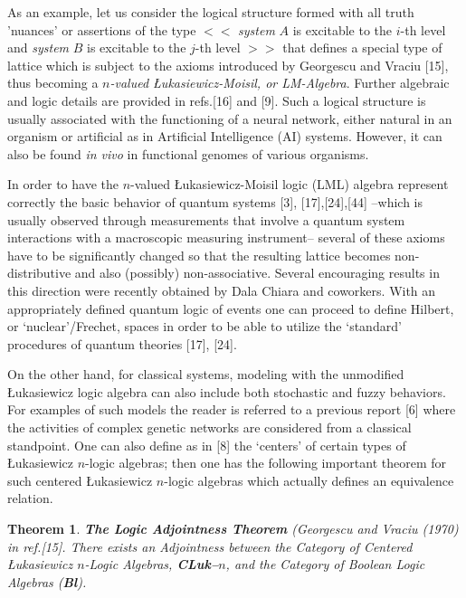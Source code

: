 \documentclass[12pt]{article}
\theoremstyle{plain}
\newtheorem{theorem}{Theorem}[section]
\theoremstyle{definition}
\numberwithin{equation}{section}
\begin{document}


As an example, let us consider the logical structure formed with all truth 'nuances' or assertions of the type $<<$ \emph{system} $A$ is excitable to the $i$-th level and \emph{system} $B$ is excitable to the $j$-th level $>>$ that defines a special type of lattice which is subject to the axioms introduced by Georgescu and Vraciu [15], thus becoming a \emph{$n$-valued \L{}ukasiewicz-Moisil, or LM-Algebra}. Further algebraic and logic details are provided in refs.[16] and [9]. Such a logical structure is usually associated with the functioning of a neural network, either natural in an organism or artificial as in Artificial Intelligence (AI)  systems. However, it can also be found \emph{ in vivo} in functional genomes of various organisms.

In order to have the $n$-valued \L{}ukasiewicz-Moisil logic (LML) algebra represent correctly the basic behavior of quantum systems [3], [17],[24],[44] --which is usually observed through measurements that involve a quantum system interactions with a macroscopic measuring instrument-- several of these axioms have to be significantly changed so that the resulting lattice becomes non-distributive and also (possibly) non-associative. Several encouraging results in this direction were recently obtained by Dala Chiara and coworkers. With an appropriately defined quantum logic of events one can proceed to define Hilbert, or `nuclear'/Frechet, spaces in order to be able to utilize the `standard' procedures of quantum theories [17], [24].

 On the other hand, for classical systems, modeling with the unmodified \L{}ukasiewicz logic algebra can also include both stochastic and fuzzy behaviors. For examples of such models the reader is referred to a previous report [6] where the activities of complex genetic networks are considered from a classical standpoint. One can also define as in [8] the `centers' of certain types of \L{}ukasiewicz $n$-logic algebras; then one has the following important theorem for such centered \L{}ukasiewicz $n$-logic algebras which actually defines an equivalence relation.


\begin{theorem} {\rm{\textbf{The Logic Adjointness Theorem} (Georgescu and Vraciu (1970) in ref.[15].}}
There exists an Adjointness between the Category of Centered \L ukasiewicz $n$-Logic Algebras, \textbf{CLuk--$n$}, and the Category
of Boolean Logic Algebras (\textbf{Bl}).
\end{theorem}
\end{document}
